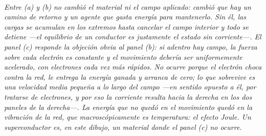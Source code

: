 \begin{center}
\\[0.5em]
{\small\itshape Entre (a) y (b) no cambió el material ni el campo aplicado:
cambió que hay un camino de retorno y un agente que gasta energía para
mantenerlo. Sin él, las cargas se acumulan en los extremos hasta cancelar el
campo interior y todo se detiene ---el equilibrio de un conductor es
justamente el estado sin corriente---. El panel (c) responde la objeción
obvia al panel (b): si adentro hay campo, la fuerza sobre cada electrón es
constante y el movimiento debería ser uniformemente acelerado, con electrones
cada vez más rápidos. No ocurre porque el electrón choca contra la red, le
entrega la energía ganada y arranca de cero; lo que sobrevive es una velocidad
media pequeña a lo largo del campo ---en sentido opuesto a él, por tratarse de
electrones, y por eso la corriente resulta hacia la derecha en los dos paneles
de la derecha---. La energía que no quedó en el
movimiento quedó en la vibración de la red, que macroscópicamente es
temperatura: el efecto Joule. Un superconductor es, en este dibujo, un material
donde el panel (c) no ocurre.}
\end{center}
